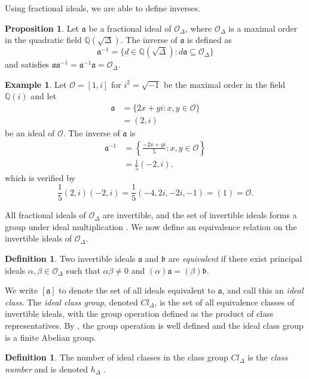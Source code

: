 \documentclass{ucalgthes1}
\theoremstyle{definition}
\newtheorem{prop}[thm]{Proposition}
\newtheorem{defn}[thm]{Definition}
\newtheorem{example}[thm]{Example}
\newcommand{\QQ}{\mathbb{Q}}
\newcommand{\OO}{\mathcal{O}}
\newcommand{\ideal}{\mathfrak}
\newcommand{\idealclass}[1]{\left[ \ideal #1 \right]}
\newcommand{\aclass}{\idealclass a}
\begin{document}
Using fractional ideals, we are able to define inverses.

\begin{prop}
\cite[Proposition 2.14]{Ramachandran2006} Let $\ideal a$ be a fractional ideal of $\OO_\Delta$, where $\OO_\Delta$ is a maximal order in the quadratic field $\QQ(\sqrt \Delta)$.  The inverse of $\ideal a$ is defined as
\[
	\ideal a^{-1} = \{ d \in \QQ(\sqrt \Delta) : d \ideal a \subseteq \OO_\Delta \}
\]
and satisfies $\ideal a \ideal a^{-1} = \ideal a^{-1} \ideal a = \OO_\Delta$.
\end{prop}

\begin{example}
Let $\OO = [1, i]$ for $i^2 = \sqrt{-1}$ be the maximal order in the field $\QQ(i)$ and let 
\begin{align*}
	\ideal a &= \{2x + yi : x, y \in \OO\} \\
	&= (2, i)
\end{align*}
be an ideal of $\OO$.  The inverse of $\ideal a$ is
\begin{align*}
  \ideal a^{-1} &= \left\{ \frac{-2x + yi}{5} : x, y \in \OO \right\} \\ 
  &= \frac{1}{5} (-2, i),
\end{align*}
which is verified by
\[
\frac{1}{5}(2, i)(-2, i) = \frac{1}{5}(-4, 2i, -2i, -1) = (1) = \OO.
\]
\end{example}

All fractional ideals of $\OO_\Delta$ are invertible, and the set of invertible ideals forms a group under ideal multiplication \cite[Theorem 2.26]{Sawilla2004}.  We now define an equivalence relation on the invertible ideals of $\OO_\Delta$.

\begin{defn}
\cite[p.88]{Jacobson2009} Two invertible ideals $\ideal a$ and $\ideal b$ are \emph{equivalent} if there exist principal ideals $\alpha, \beta \in \OO_\Delta$ such that $\alpha \beta \neq 0$ and $(\alpha)\ideal a = (\beta) \ideal b$.
\end{defn}

We write $\aclass$ to denote the set of all ideals equivalent to $\ideal a$, and call this an \emph{ideal class}.  The \emph{ideal class group}, denoted $Cl_\Delta$, is the set of all equivalence classes of invertible ideals, with the group operation defined as the product of class representatives.  By \cite[p.136]{Cohn1980}, the group operation is well defined and the ideal class group is a finite Abelian group.

\begin{defn}
The number of ideal classes in the class group $Cl_\Delta$ is the \emph{class number} and is denoted $h_\Delta$ \cite[p.153]{Jacobson2009}.
\end{defn}
\end{document}
